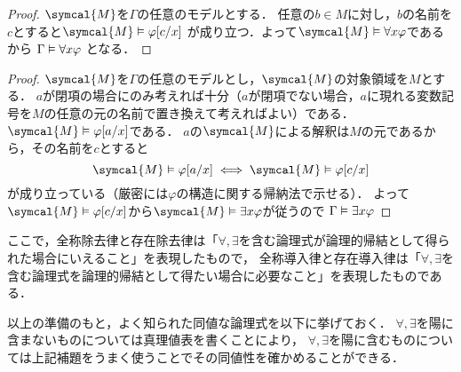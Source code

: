 \begin{proof}
	\(\symcal{M}\)を\(\Gamma\)の任意のモデルとする．
	任意の\(b \in M\)に対し，\(b\)の名前を\(c\)とすると\(\symcal{M} \satisfy \subst{\varphi}{c/x}\)
	が成り立つ．よって\(\symcal{M} \satisfy \forall x \varphi\)であるから
	\(\Gamma \vDash \forall x \varphi\)
	となる．
\end{proof}


\begin{proof}
	\(\symcal{M}\)を\(\Gamma\)の任意のモデルとし，\(\symcal{M}\)の対象領域を\(M\)とする．
	\(a\)が閉項の場合にのみ考えれば十分（\(a\)が閉項でない場合，\(a\)に現れる変数記号を\(M\)の任意の元の名前で置き換えて考えればよい）である．
	\(\symcal{M} \satisfy \subst{\varphi}{a/x}\)である．
	\(a\)の\(\symcal{M}\)による解釈は\(M\)の元であるから，その名前を\(c\)とすると
	\[
		\symcal{M} \satisfy \subst{\varphi}{a/x} \metaequivalent \symcal{M} \satisfy \subst{\varphi}{c/x}
	\]
	が成り立っている（厳密には\(\varphi\)の構造に関する帰納法で示せる）．
	よって\(\symcal{M} \satisfy \subst{\varphi}{c/x}\)から\(\symcal{M} \satisfy \exists x \varphi\)が従うので
	\(\Gamma \vDash \exists x \varphi\)
\end{proof}

ここで，全称除去律と存在除去律は「\(\forall, \exists\)を含む論理式が論理的帰結として得られた場合にいえること」を表現したもので，
全称導入律と存在導入律は「\(\forall, \exists\)を含む論理式を論理的帰結として得たい場合に必要なこと」を表現したものである．

以上の準備のもと，よく知られた同値な論理式を以下に挙げておく．
\(\forall, \exists\)を陽に含まないものについては真理値表を書くことにより，
\(\forall, \exists\)を陽に含むものについては上記補題をうまく使うことでその同値性を確かめることができる．



